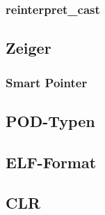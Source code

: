 \begin{multicols}{3}
\subsubsection{reinterpret\_cast}
\lipsum[1]
\subsection{Zeiger}
\subsubsection{Smart Pointer}
\subsection{POD-Typen}

\subsection{ELF-Format}
\subsection{CLR}


\end{multicols}
